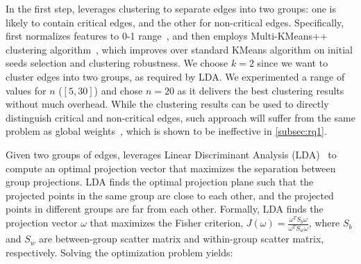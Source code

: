 In the first step, \tool leverages clustering to separate edges into two groups: one is likely to contain critical edges, and the other for non-critical edges.
%
%
Specifically, \tool first normalizes features to 0-1 range~\cite{friedman2001elements}, and then employs Multi-KMeans++ clustering algorithm~\cite{Arthur:2007:KAC:1283383.1283494}, which improves over standard KMeans algorithm on initial seeds selection and clustering robustness.
We choose $k=2$ since we want to cluster edges into two groups, as required by LDA.
We experimented a range of values for $n$ ($[5, 30]$) and chose $n=20$ as it delivers the best clustering results without much overhead.
While the clustering results can be used to directly distinguish critical and non-critical edges, such approach will suffer from the same problem as global weights~\cite{hassan2019nodoze}, which is shown to be ineffective in \cref{subsec:rq1}.





Given two groups of edges, \tool leverages Linear Discriminant Analysis (LDA)~\cite{Mika99fisherdiscriminant} to compute an optimal projection vector that maximizes the separation between group projections.
%
LDA finds the optimal projection plane such that the projected points in the same group are close to each other, and the projected points in different groups are far from each other.
%
Formally, LDA finds the projection vector $\omega$ that maximizes the Fisher criterion, $J(\omega) = \frac{\omega^TS_b\omega}{\omega^TS_w\omega}$, where $S_b$ and $S_w$ are between-group scatter matrix and within-group scatter matrix, respectively. 
%
Solving the optimization problem yields:

